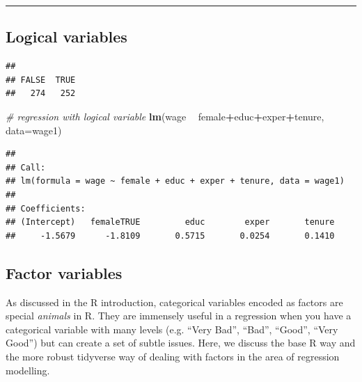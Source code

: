 \documentclass[]{book}
\newenvironment{Shaded}{\begin{snugshade}}{\end{snugshade}}
\newcommand{\CommentTok}[1]{\textcolor[rgb]{0.56,0.35,0.01}{\textit{#1}}}
\newcommand{\DataTypeTok}[1]{\textcolor[rgb]{0.13,0.29,0.53}{#1}}
\newcommand{\KeywordTok}[1]{\textcolor[rgb]{0.13,0.29,0.53}{\textbf{#1}}}
\newcommand{\NormalTok}[1]{#1}
\newcommand{\OperatorTok}[1]{\textcolor[rgb]{0.81,0.36,0.00}{\textbf{#1}}}
\newcommand{\StringTok}[1]{\textcolor[rgb]{0.31,0.60,0.02}{#1}}
\begin{document}
\begin{center}\rule{0.5\linewidth}{\linethickness}\end{center}

\hypertarget{logical-variables}{%
\subsection{Logical variables}\label{logical-variables}}

\begin{Shaded}
\end{Shaded}

\begin{verbatim}
## 
## FALSE  TRUE 
##   274   252
\end{verbatim}

\begin{Shaded}
\begin{Highlighting}[]
\CommentTok{# regression with logical variable}
\KeywordTok{lm}\NormalTok{(wage }\OperatorTok{~}\StringTok{ }\NormalTok{female}\OperatorTok{+}\NormalTok{educ}\OperatorTok{+}\NormalTok{exper}\OperatorTok{+}\NormalTok{tenure, }\DataTypeTok{data=}\NormalTok{wage1)}
\end{Highlighting}
\end{Shaded}

\begin{verbatim}
## 
## Call:
## lm(formula = wage ~ female + educ + exper + tenure, data = wage1)
## 
## Coefficients:
## (Intercept)   femaleTRUE         educ        exper       tenure  
##     -1.5679      -1.8109       0.5715       0.0254       0.1410
\end{verbatim}

\hypertarget{factor-variables}{%
\subsection{Factor variables}\label{factor-variables}}

As discussed in the R introduction, categorical variables encoded as
factors are special \emph{animals} in R. They are immensely useful in a
regression when you have a categorical variable with many levels (e.g.
``Very Bad'', ``Bad'', ``Good'', ``Very Good'') but can create a set of
subtle issues. Here, we discuss the base R way and the more robust
tidyverse way of dealing with factors in the area of regression
modelling.
\end{document}
